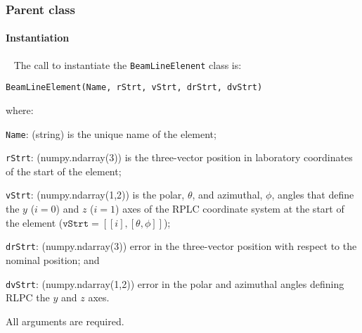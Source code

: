 \subsubsection{Parent class}

\paragraph{Instantiation}   ~\newline
\noindent
The call to instantiate the \texttt{BeamLineElenent} class is:
\begin{center}
  \texttt{BeamLineElement(Name, rStrt, vStrt, drStrt, dvStrt)}
\end{center}
where:
\begin{description}
  \item\texttt{Name}: (string) is the unique name of the element;
  \item\texttt{rStrt}: (numpy.ndarray(3)) is the three-vector
    position in laboratory coordinates of the start of the element;
  \item\texttt{vStrt}: (numpy.ndarray(1,2)) is the polar, $\theta$,
    and azimuthal, $\phi$, angles that define the $y$ ($i=0$) and $z$
    ($i=1$)  axes of the RPLC coordinate system at the start of the
    element ($\texttt{vStrt}=[[i],[\theta, \phi]]$);  
  \item\texttt{drStrt}: (numpy.ndarray(3)) error in the three-vector
    position with respect to the nominal position; and
  \item\texttt{dvStrt}: (numpy.ndarray(1,2)) error in the polar and
    azimuthal angles defining RLPC the $y$ and $z$ axes.
\end{description}
All arguments are required.


